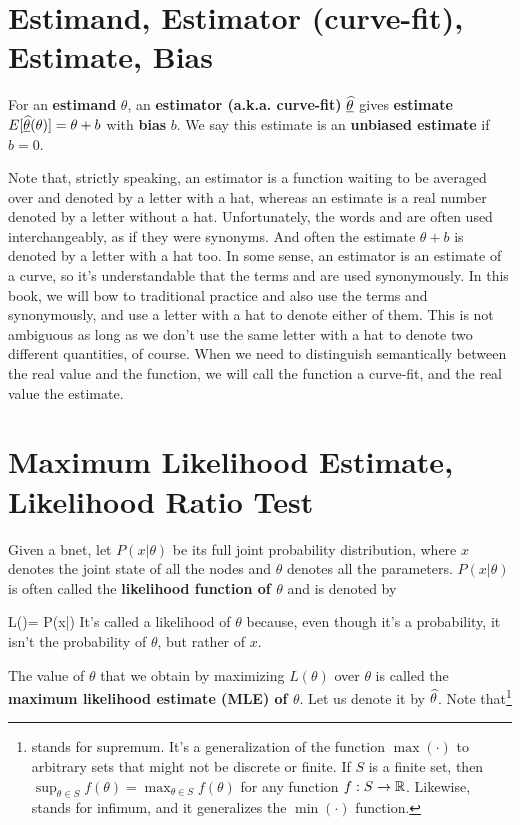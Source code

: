 \section{Estimand, Estimator (curve-fit), Estimate, Bias}
\label{sec-estimand}
For an {\bf estimand} $\theta$,
an {\bf estimator (a.k.a. curve-fit)} $\ul{\HAT{\theta}}$
gives {\bf estimate} $E[\ul{\HAT{\theta}}(\theta)]=\theta+b$
with {\bf bias} $b$.
We say this estimate is an {\bf unbiased estimate}
if $b=0$.

Note that, strictly
speaking, an estimator is a function
waiting to be averaged over
and denoted by a letter with a hat,
whereas an estimate is a real number
denoted by a letter without a hat.
Unfortunately, the
words  and
 are often used interchangeably,
as if they were synonyms.
And often the estimate $\theta + b$
is denoted by a letter with a hat too.
In some sense, an estimator is an estimate
of a curve, so it's understandable that
the terms  and 
are used synonymously.
In this book, we will bow to traditional
practice and
also use
the terms  and 
synonymously, and use a letter
with a hat to denote either of them.
This is not
ambiguous as long as we don't
use the same letter with a
hat to denote two different quantities, of course.
When we need to distinguish semantically
between the real value and the function,
we will call the function a curve-fit,
and the real value the estimate.

\section{Maximum Likelihood Estimate,
Likelihood Ratio Test}
\label{sec-likelihood-ratio}

Given a bnet, let $P(x|\theta)$
be its full joint probability distribution,
where
$x$ denotes the joint state
of all the nodes and $\theta$
denotes all the parameters.
 $P(x|\theta)$ is often
called the {\bf likelihood function of $\theta$}
and is denoted by

\beq
L(\theta)= P(x|\theta)
\eeq
It's called a likelihood of $\theta$
because, even though it's a probability,
it isn't the probability of $\theta$,
but rather of $x$.

The value of $\theta$
that we obtain by maximizing $L(\theta)$
over $\theta$ is called
the
{\bf maximum likelihood
estimate (MLE) of $\theta$}. Let us denote it by
${\widehat{\theta}}$. Note that\footnote{ stands for supremum.
It's a generalization of the function $\max(\cdot)$
to arbitrary sets
that might not be discrete or finite.
If $S$ is a
finite set,
then $\sup_{\theta\in S} f(\theta)=
\max_{\theta\in S} f(\theta)$
for any function $f:S\rightarrow { \mathbb{R}}$.
Likewise,  stands for infimum,
and it generalizes the $\min(\cdot)$ function.}

